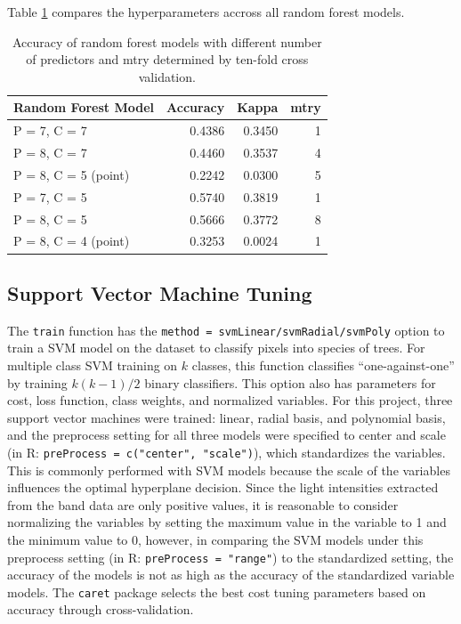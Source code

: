 \documentclass[12pt,twoside]{reedthesis}
\begin{document}
Table \ref{tab:resultsRF} compares the hyperparameters accross all random forest models.
\begin{table}

\caption{\label{tab:resultsRF}Accuracy of random forest models with different number of predictors and mtry determined by ten-fold cross validation.}
\centering
\begin{tabular}[t]{l|r|r|r}
\hline
Random Forest Model & Accuracy & Kappa & mtry\\
\hline
P = 7, C = 7 & 0.4386 & 0.3450 & 1\\
\hline
P = 8, C = 7 & 0.4460 & 0.3537 & 4\\
\hline
P = 8, C = 5 (point) & 0.2242 & 0.0300 & 5\\
\hline
P = 7, C = 5 & 0.5740 & 0.3819 & 1\\
\hline
P = 8, C = 5 & 0.5666 & 0.3772 & 8\\
\hline
P = 8, C = 4 (point) & 0.3253 & 0.0024 & 1\\
\hline
\end{tabular}
\end{table}
\hypertarget{support-vector-machine-tuning}{%
\subsection{Support Vector Machine Tuning}\label{support-vector-machine-tuning}}

The \texttt{train} function has the \texttt{method\ =\ svmLinear/svmRadial/svmPoly} option to train a SVM model on the dataset to classify pixels into species of trees. For multiple class SVM training on \(k\) classes, this function classifies ``one-against-one'' by training \(k(k - 1)/2\) binary classifiers. This option also has parameters for cost, loss function, class weights, and normalized variables. For this project, three support vector machines were trained: linear, radial basis, and polynomial basis, and the preprocess setting for all three models were specified to center and scale (in R: \texttt{preProcess\ =\ c("center",\ "scale")}), which standardizes the variables. This is commonly performed with SVM models because the scale of the variables influences the optimal hyperplane decision. Since the light intensities extracted from the band data are only positive values, it is reasonable to consider normalizing the variables by setting the maximum value in the variable to 1 and the minimum value to 0, however, in comparing the SVM models under this preprocess setting (in R: \texttt{preProcess\ =\ "range"}) to the standardized setting, the accuracy of the models is not as high as the accuracy of the standardized variable models. The \texttt{caret} package selects the best cost tuning parameters based on accuracy through cross-validation.
\end{document}
